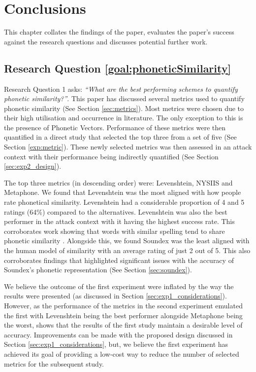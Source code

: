 \chapter{Conclusions}
This chapter collates the findings of the paper, evaluates the paper's success against the research questions and discusses potential further work.

\section{Research Question \ref{goal:phoneticSimilarity}}

Research Question 1 asks: \textit{“What are the best performing schemes to quantify phonetic similarity?”}. This paper has discussed several metrics used to quantify phonetic similarity (See Section \ref{sec:metrics}). Most metrics were chosen due to their high utilisation and occurrence in literature. The only exception to this is the presence of Phonetic Vectors. Performance of these metrics were then quantified in a direct study that selected the top three from a set of five (See Section \ref{exp:metric}). These newly selected metrics was then assessed in an attack context with their performance being indirectly quantified (See Section \ref{sec:exp2_design}).

The top three metrics (in descending order) were: Levenshtein, NYSIIS and Metaphone. We found that Levenshtein was the most aligned with how people rate phonetical similarity. Levenshtein had a considerable proportion of 4 and 5 ratings (64\%) compared to the alternatives. Levenshtein was also the best performer in the attack context with it having the highest success rate. This corroborates work showing that words with similar spelling tend to share phonetic similarity \cite{hettiarachchi2012sparcl}.
Alongside this, we found Soundex was the least aligned with the human model of similarity with an average rating of just 2 out of 5. This also corroborates findings that highlighted significant issues with the accuracy of Soundex’s phonetic representation (See Section \ref{sec:soundex}).

We believe the outcome of the first experiment were inflated by the way the results were presented (as discussed in Section \ref{sec:exp1_considerations}). However, as the performance of the metrics in the second experiment emulated the first with Levenshtein being the best performer alongside Metaphone being the worst, shows that the results of the first study maintain a desirable level of accuracy. Improvements can be made with the proposed design discussed in Section \ref{sec:exp1_considerations}, but, we believe the first experiment has achieved its goal of providing a low-cost way to reduce the number of selected metrics for the subsequent study.

